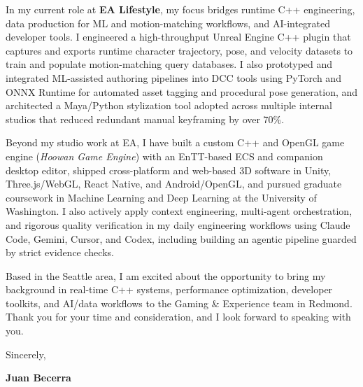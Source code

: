 \documentclass[letterpaper,11pt]{article}
\begin{document}
In my current role at \textbf{EA Lifestyle}, my focus bridges runtime C++ engineering, data production
for ML and motion-matching workflows, and AI-integrated developer tools. I engineered a high-throughput
Unreal Engine C++ plugin that captures and exports runtime character trajectory, pose, and velocity
datasets to train and populate motion-matching query databases. I also prototyped and integrated
ML-assisted authoring pipelines into DCC tools using PyTorch and ONNX Runtime for automated asset
tagging and procedural pose generation, and architected a Maya/Python stylization tool adopted across
multiple internal studios that reduced redundant manual keyframing by over 70\%.

Beyond my studio work at EA, I have built a custom C++ and OpenGL game engine (\emph{Hoowan Game Engine})
with an EnTT-based ECS and companion desktop editor, shipped cross-platform and web-based 3D software in
Unity, Three.js/WebGL, React Native, and Android/OpenGL, and pursued graduate coursework in Machine Learning
and Deep Learning at the University of Washington. I also actively apply context engineering, multi-agent
orchestration, and rigorous quality verification in my daily engineering workflows using Claude Code,
Gemini, Cursor, and Codex, including building an agentic pipeline guarded by strict evidence checks.

Based in the Seattle area, I am excited about the opportunity to bring my background in real-time C++
systems, performance optimization, developer toolkits, and AI/data workflows to the Gaming \& Experience
team in Redmond. Thank you for your time and consideration, and I look forward to speaking with you.

\vspace{10pt}
\noindent Sincerely,

\vspace{14pt}
\noindent \textbf{Juan Becerra}
\end{document}

